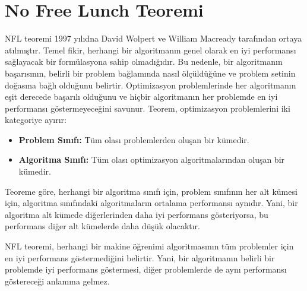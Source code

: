 \section{No Free Lunch Teoremi}
NFL teoremi 1997 yılıdna David Wolpert ve William Macready tarafından ortaya atılmıştır. Temel fikir, herhangi bir algoritmanın genel olarak en iyi performansı sağlayacak bir formülasyona sahip olmadığıdır. Bu nedenle, bir algoritmanın başarısının, belirli bir problem bağlamında nasıl ölçüldüğüne ve problem setinin doğasına bağlı olduğunu belirtir. Optimizasyon problemlerinde her algoritmanın eşit derecede başarılı olduğunu ve hiçbir algoritmanın her problemde en iyi performansı göstermeyeceğini savunur. 
Teorem, optimizasyon problemlerini iki kategoriye ayırır:
\begin{itemize}
	\item \textbf{Problem Sınıfı:} Tüm olası problemlerden oluşan bir kümedir.
	\item \textbf{Algoritma Sınıfı:} Tüm olası optimizasyon algoritmalarından oluşan bir kümedir.
\end{itemize}

Teoreme göre, herhangi bir algoritma sınıfı için, problem sınıfının her alt kümesi için, algoritma sınıfındaki algoritmaların ortalama performansı aynıdır. Yani, bir algoritma alt kümede diğerlerinden daha iyi performans gösteriyorsa, bu performans diğer alt kümelerde daha düşük olacaktır.

NFL teoremi, herhangi bir makine öğrenimi algoritmasının tüm problemler için en iyi performans göstermediğini belirtir. Yani, bir algoritmanın belirli bir problemde iyi performans göstermesi, diğer problemlerde de aynı performansı göstereceği anlamına gelmez. 

\newpage